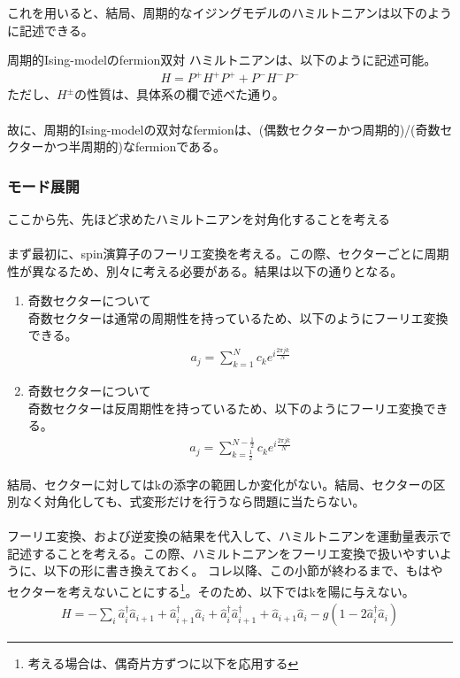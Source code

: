 \documentclass[a4paper,10.5pt]{article}
\numberwithin{equation}{section}
\begin{document}
これを用いると、結局、周期的なイジングモデルのハミルトニアンは以下のように記述できる。
\begin{resultbox}{周期的Ising-modelのfermion双対}
ハミルトニアンは、以下のように記述可能。
\begin{align*}
    H=P^{+}H^{+}P^{+}+P^{-}H^{-}P^{-}
\end{align*}
ただし、$H^{\pm}$の性質は、具体系の欄で述べた通り。\\
\\
故に、周期的Ising-modelの双対なfermionは、(偶数セクターかつ周期的)/(奇数セクターかつ半周期的)なfermionである。
\end{resultbox}


\subsubsection{モード展開}
ここから先、先ほど求めたハミルトニアンを対角化することを考える\\
\\
まず最初に、spin演算子のフーリエ変換を考える。この際、セクターごとに周期性が異なるため、別々に考える必要がある。結果は以下の通りとなる。
\begin{enumerate}
    \item 奇数セクターについて\\
    奇数セクターは通常の周期性を持っているため、以下のようにフーリエ変換できる。
    \begin{align*}
        a_{j}=\sum_{k=1}^{N}c_{k}e^{i\frac{2\pi jk}{N}}
    \end{align*}
    \item 奇数セクターについて\\
    奇数セクターは反周期性を持っているため、以下のようにフーリエ変換できる。
    \begin{align*}
        a_{j}=\sum_{k=\frac{1}{2}}^{N-\frac{1}{2}}c_{k}e^{i\frac{2\pi jk}{N}}
    \end{align*}
\end{enumerate}
結局、セクターに対してはkの添字の範囲しか変化がない。結局、セクターの区別なく対角化しても、式変形だけを行うなら問題に当たらない。\\
\\
フーリエ変換、および逆変換の結果を代入して、ハミルトニアンを運動量表示で記述することを考える。この際、ハミルトニアンをフーリエ変換で扱いやすいように、以下の形に書き換えておく。
コレ以降、この小節が終わるまで、もはやセクターを考えないことにする\footnote{考える場合は、偶奇片方ずつに以下を応用する}。そのため、以下ではkを陽に与えない。
 \begin{equation}\begin{split}\label{ising_hami}
    H=-\sum_{i} \hat{a}^{\dagger}_{i}\hat{a}_{i+1} + \hat{a}^{\dagger}_{i+1}\hat{a}_{i}
    +\hat{a}^{\dagger}_{i}\hat{a}^{\dagger}_{i+1} + \hat{a}_{i+1}\hat{a}_{i}
    -g(1-2\hat{a}_{i}^{\dagger}\hat{a}_{i}) 
    \end{split} \end{equation}
\end{document}
